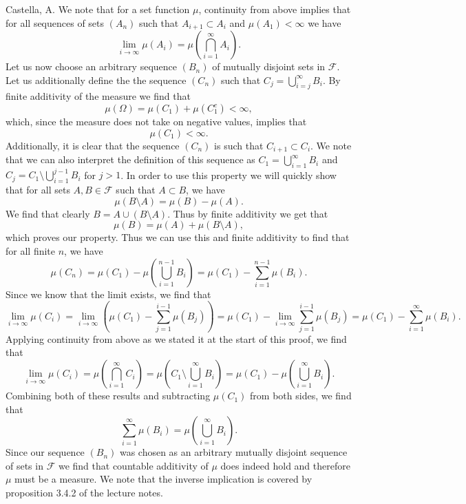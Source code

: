 \begin{solution}[3.15]{Castella, A.}
    We note that for a set function $\mu$, continuity from above implies that for all sequences of sets $(A_n)$ such that $A_{i+1} \subset A_i$ and $\mu(A_1) < \infty$ we have
    $$
        \lim_{i\rightarrow\infty}\mu(A_i) = \mu\left(\bigcap_{i=1}^\infty A_i\right).
    $$
    Let us now choose an arbitrary sequence $(B_n)$ of mutually disjoint sets in $\mathcal{F}$. Let us additionally define the the sequence $(C_n)$ such that $C_j = \bigcup_{i=j}^\infty B_i$. By finite additivity of the measure we find that
    $$
        \mu(\Omega) = \mu(C_1) + \mu(C_1^c) < \infty,
    $$
    which, since the measure does not take on negative values, implies that
    $$
        \mu(C_1) < \infty.
    $$
    Additionally, it is clear that the sequence $(C_n)$ is such that $C_{i+1} \subset C_{i}$. We note that we can also interpret the definition of this sequence as $C_1 = \bigcup_{i=1}^\infty B_i$ and $C_j = C_1 \setminus \bigcup_{i=1}^{j-1} B_i$ for $j > 1$. In order to use this property we will quickly show that for all sets $A,B \in \mathcal{F}$ such that $A \subset B$, we have
    $$
        \mu(B\setminus A) = \mu(B) - \mu(A).
    $$
    We find that clearly $B = A \cup (B\setminus A)$. Thus by finite additivity we get that
    $$
        \mu(B) = \mu(A) + \mu(B\setminus A),
    $$
    which proves our property. Thus we can use this and finite additivity to find that for all finite $n$, we have
    $$
        \mu(C_n) = \mu(C_1) - \mu\left(\bigcup_{i=1}^{n-1} B_i\right) = \mu(C_1) - \sum_{i=1}^{n-1}\mu(B_i).
    $$
    Since we know that the limit exists, we find that
    $$
        \lim_{i\rightarrow\infty}\mu(C_i) = \lim_{i\rightarrow\infty}\left(\mu(C_1) - \sum_{j=1}^{i-1} \mu(B_j)\right) = \mu(C_1) - \lim_{i\rightarrow\infty}\sum_{j=1}^{i-1}\mu(B_j) = \mu(C_1) - \sum_{i=1}^\infty \mu(B_i).
    $$
    Applying continuity from above as we stated it at the start of this proof, we find that
    $$
        \lim_{i\rightarrow\infty}\mu(C_i) = \mu\left(\bigcap_{i=1}^\infty C_i\right) = \mu\left(C_1\setminus \bigcup_{i=1}^\infty B_i\right) = \mu(C_1) - \mu\left(\bigcup_{i=1}^\infty B_i\right).
    $$
    Combining both of these results and subtracting $\mu(C_1)$ from both sides, we find that
    $$
        \sum_{i=1}^\infty \mu(B_i) = \mu\left(\bigcup_{i=1}^\infty B_i\right).
    $$
    Since our sequence $(B_n)$ was chosen as an arbitrary mutually disjoint sequence of sets in $\mathcal{F}$ we find that countable additivity of $\mu$ does indeed hold and therefore $\mu$ must be a measure. We note that the inverse implication is covered by proposition 3.4.2 of the lecture notes.
\end{solution}

